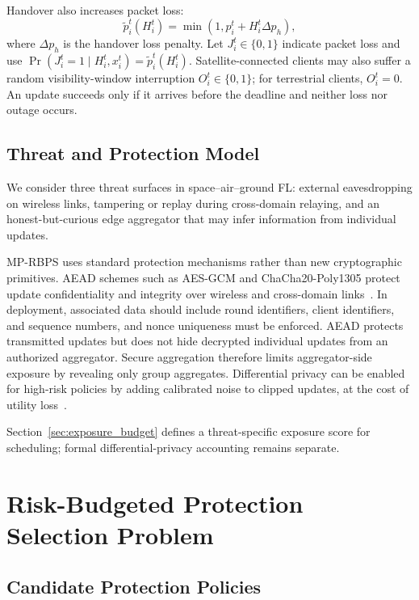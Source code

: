 \documentclass[preprint,12pt]{elsarticle}
\begin{document}
Handover also increases packet loss:
\begin{equation}
	\tilde{p}_i^t(H_i^t) = \min \left(1, p_i^t + H_i^t \Delta p_h \right),
	\label{eq:handover_loss}
\end{equation}
where $\Delta p_h$ is the handover loss penalty. Let $J_i^t\in\{0,1\}$ indicate packet loss and use $\Pr(J_i^t=1\mid H_i^t,x_i^t)=\tilde p_i^t(H_i^t)$. Satellite-connected clients may also suffer a random visibility-window interruption $O_i^t\in\{0,1\}$; for terrestrial clients, $O_i^t=0$. An update succeeds only if it arrives before the deadline and neither loss nor outage occurs.

\subsection{Threat and Protection Model}
\label{sec:threat}

We consider three threat surfaces in space--air--ground FL: external eavesdropping on wireless links, tampering or replay during cross-domain relaying, and an honest-but-curious edge aggregator that may infer information from individual updates.

MP-RBPS uses standard protection mechanisms rather than new cryptographic primitives. AEAD schemes such as AES-GCM and ChaCha20-Poly1305 protect update confidentiality and integrity over wireless and cross-domain links~\cite{nist2007gcm,rfc8439}. In deployment, associated data should include round identifiers, client identifiers, and sequence numbers, and nonce uniqueness must be enforced. AEAD protects transmitted updates but does not hide decrypted individual updates from an authorized aggregator. Secure aggregation therefore limits aggregator-side exposure by revealing only group aggregates. Differential privacy can be enabled for high-risk policies by adding calibrated noise to clipped updates, at the cost of utility loss~\cite{wei2023pfl_dp,yuan2023amplitude,yuan2023privacyresource}.

Section~\ref{sec:exposure_budget} defines a threat-specific exposure score for scheduling; formal differential-privacy accounting remains separate.

\section{Risk-Budgeted Protection Selection Problem}

\subsection{Candidate Protection Policies}
\end{document}
